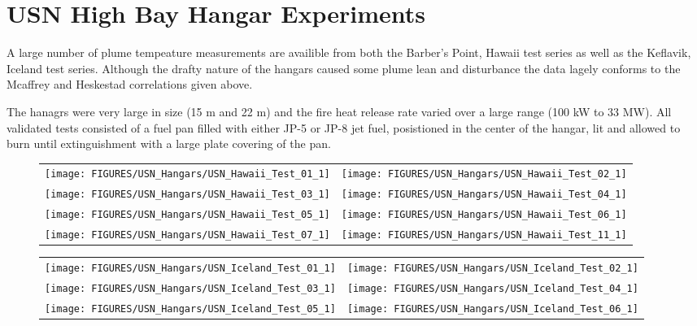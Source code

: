 \section{USN High Bay Hangar Experiments}

\label{USN_Plume}

A large number of plume tempeature measurements are availible from both the Barber's Point, Hawaii test series as well as the Keflavik, Iceland test series. Although the drafty nature of the hangars caused some plume lean and disturbance the data lagely conforms to the Mcaffrey and Heskestad correlations given above.

The hanagrs were very large in size (15 m and 22 m) and the fire heat release rate varied over a large range (100 kW to 33 MW). All validated tests consisted of a fuel pan filled with either JP-5 or JP-8 jet fuel, posistioned in the center of the hangar, lit and allowed to burn until extinguishment with a large plate covering of the pan.

\begin{figure}[p]
\begin{tabular*}{\textwidth}{l@{\extracolsep{\fill}}r}
\texttt{[image: FIGURES/USN\_Hangars/USN\_Hawaii\_Test\_01\_1]} &
\texttt{[image: FIGURES/USN\_Hangars/USN\_Hawaii\_Test\_02\_1]} \\
\texttt{[image: FIGURES/USN\_Hangars/USN\_Hawaii\_Test\_03\_1]} &
\texttt{[image: FIGURES/USN\_Hangars/USN\_Hawaii\_Test\_04\_1]} \\
\texttt{[image: FIGURES/USN\_Hangars/USN\_Hawaii\_Test\_05\_1]} &
\texttt{[image: FIGURES/USN\_Hangars/USN\_Hawaii\_Test\_06\_1]} \\
\texttt{[image: FIGURES/USN\_Hangars/USN\_Hawaii\_Test\_07\_1]} &
\texttt{[image: FIGURES/USN\_Hangars/USN\_Hawaii\_Test\_11\_1]}
\end{tabular*}
\label{USN_Plume_Hawaii}
\end{figure}

\begin{figure}[p]
\begin{tabular*}{\textwidth}{l@{\extracolsep{\fill}}r}
\texttt{[image: FIGURES/USN\_Hangars/USN\_Iceland\_Test\_01\_1]} &
\texttt{[image: FIGURES/USN\_Hangars/USN\_Iceland\_Test\_02\_1]} \\
\texttt{[image: FIGURES/USN\_Hangars/USN\_Iceland\_Test\_03\_1]} &
\texttt{[image: FIGURES/USN\_Hangars/USN\_Iceland\_Test\_04\_1]} \\
\texttt{[image: FIGURES/USN\_Hangars/USN\_Iceland\_Test\_05\_1]} &
\texttt{[image: FIGURES/USN\_Hangars/USN\_Iceland\_Test\_06\_1]} \\
\end{tabular*}
\label{USN_Plume_Iceland_1}
\end{figure}


